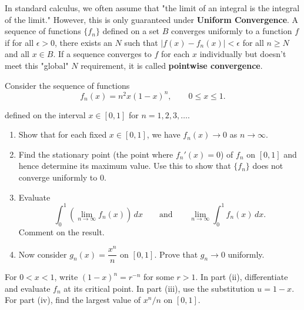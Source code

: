\begin{problem}

In standard calculus, we often assume that "the limit of an integral is the integral of the limit." 
However, this is only guaranteed under \textbf{Uniform Convergence}. A sequence of functions $\{f_n\}$ defined on a set $B$ converges uniformly to a function $f$ if for all $\epsilon > 0$, 
there exists an $N$ such that $|f(x) - f_n(x)| < \epsilon$ for all $n \ge N$ and all $x \in B$. 
If a sequence converges to $f$ for each $x$ individually but doesn't meet this "global" $N$ requirement, it is called \textbf{pointwise convergence}.


Consider the sequence of functions
\[
f_n(x)=n^2x(1-x)^n, \qquad 0\le x\le 1.
\]

defined on the interval $x \in [0, 1]$ for $n = 1, 2, 3, \dots$.

\begin{enumerate}[label=(\roman*)]
\item Show that for each fixed $x\in[0,1]$, we have $f_n(x)\to 0$ as $n\to\infty$.
\item Find the stationary point (the point where $f_n'(x) = 0$) of $f_n$ on $[0,1]$ and hence determine its maximum value. Use this to show that $\{f_n\}$ does not converge uniformly to $0$.
\item Evaluate
\[
\int_0^1 \left(\lim_{n\to\infty} f_n(x)\right)\,dx
\qquad \text{and} \qquad
\lim_{n\to\infty}\int_0^1 f_n(x)\,dx.
\]
Comment on the result.
\item Now consider $g_n(x)=\dfrac{x^n}{n}$ on $[0,1]$. Prove that $g_n\to 0$ uniformly.
\end{enumerate}
\end{problem}

\begin{hint}
For $0<x<1$, write $(1-x)^n=r^{-n}$ for some $r>1$. In part (ii), differentiate and evaluate $f_n$ at its critical point. In part (iii), use the substitution $u=1-x$. For part (iv), find the largest value of $x^n/n$ on $[0,1]$.
\end{hint}

